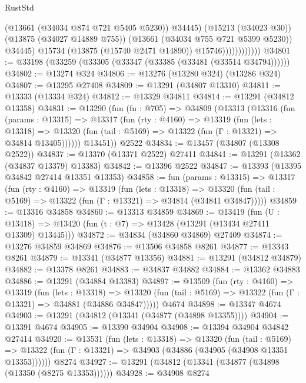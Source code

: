 \begin{lexlean}{RustStd}
\begin{coremodule}
                                (@13661 (@34034 @874 @721 @5405 @5230))
                                @34445)
                              (@15213 (@34023 @30))
                              (@13875 (@34027 @14889 @755))
                              (@13661 (@34034 @755 @721 @5399 @5230))
                              @34445)
                            @15734
                            (@13875 (@15740 @2471 @14890))
                            @15746))))))))))))
@34801 := @33198 (@33259 (@33305 (@33347 (@33385 (@33481 (@33514 @34794))))))
@34802 := @13274 @324
@34806 := @13276 (@13280 @324) (@13286 @324)
@34807 := @13295 @27408
@34809 := @13291 (@34807 @13310)
@34811 := @13333 (@13334 @324)
@34812 := @13329 @34811
@34814 := @13291 (@34812 @13358)
@34831 := @13290
    (fun (fn : @705) =>
    @34809
      (@13313
        (@13316
          (fun (params : @13315) =>
          @13317
            (fun (rty : @4160) =>
            @13319
              (fun (lets : @13318) =>
              @13320 (fun (tail : @5169) => @13322 (fun (Γ : @13321) => @34814 @13405))))))
        @13451))
    @2522
@34834 := @13457 (@34807 (@13308 @2522))
@34837 := @13370 (@13371 @2522) @27411
@34841 := @13291 (@13362 (@34837 @13379) @13383)
@34842 := @13396 @2522
@34847 := @13393 (@13395 @34842 @27414 @13351 @13353)
@34858 := fun (params : @13315) =>
  @13317
    (fun (rty : @4160) =>
    @13319
      (fun (lets : @13318) =>
      @13320 (fun (tail : @5169) => @13322 (fun (Γ : @13321) => @34814 (@34841 @34847)))))
@34859 := @13316 @34858
@34860 := @13313 @34859
@34869 := @13419
    (fun (U : @13418) => @13420 (fun (t : @7) => @13428 (@13291 (@13434 @27411 @13309) @13445)))
@34872 := @34834 (@34860 @34869) @27409
@34874 := @13276 @34859 @34869
@34876 := @13506 @34858 @8261
@34877 := @13343 @8261
@34879 := @13341 (@34877 @13356)
@34881 := @13291 (@34812 @34879)
@34882 := @13378 @8261
@34883 := @34837 @34882
@34884 := @13362 @34883
@34886 := @13291 (@34884 @13383)
@34897 := @13509
    (fun (rty : @4160) =>
    @13319
      (fun (lets : @13318) =>
      @13320 (fun (tail : @5169) => @13322 (fun (Γ : @13321) => @34881 (@34886 @34847)))))
    @4674
@34898 := @13347 @4674
@34903 := @13291 (@34812 (@13341 (@34877 (@34898 @13355))))
@34904 := @13391 @4674
@34905 := @13390 @34904
@34908 := @13394 @34904 @34842 @27414
@34920 := @13531
    (fun (lets : @13318) =>
    @13320
      (fun (tail : @5169) =>
      @13322 (fun (Γ : @13321) => @34903 (@34886 (@34905 (@34908 @13351 @13353))))))
    @8274
@34927 := @13291 (@34812 (@13341 (@34877 (@34898 (@13350 (@8275 @13353))))))
@34928 := @34908 @8274

\end{coremodule}
\end{lexlean}
